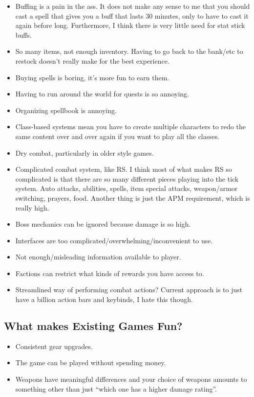 \documentclass{article}
\begin{document}
\begin{itemize}
    \item Buffing is a pain in the ass. It does not make any sense to me that you should cast a spell that
        gives you a buff that lasts 30 minutes, only to have to cast it again before long. Furthermore, I think
        there is very little need for stat stick buffs. 
    \item So many items, not enough inventory. Having to go back to the bank/etc to restock doesn't really
        make for the best experience.
    \item Buying spells is boring, it's more fun to earn them. 
    \item Having to run around the world for quests is so annoying.
    \item Organizing spellbook is annoying.
    \item Class-based systems mean you have to create multiple characters to redo the same content over and over
        again if you want to play all the classes. 
    \item Dry combat, particularly in older style games. 
    \item Complicated combat system, like RS. I think most of what makes RS so complicated is that there
        are so many different pieces playing into the tick system. Auto attacks, abilities, spells, item
        special attacks, weapon/armor switching, prayers, food. Another thing is just the APM requirement,
        which is really high.
    \item Boss mechanics can be ignored because damage is so high.
    \item Interfaces are too complicated/overwhelming/inconvenient to use. 
    \item Not enough/misleading information available to player. 
    \item Factions can restrict what kinds of rewards you have access to.
    \item Streamlined way of performing combat actions? Current approach is to just have a billion action bars
        and keybinds, I hate this though.
\end{itemize}
\subsection{What makes Existing Games Fun?}
\begin{itemize}
    \item Consistent gear upgrades.
    \item The game can be played without spending money.
    \item Weapons have meaningful differences and your choice of weapons amounts to something other than
        just ``which one has a higher damage rating''.
\end{itemize}
\end{document}

